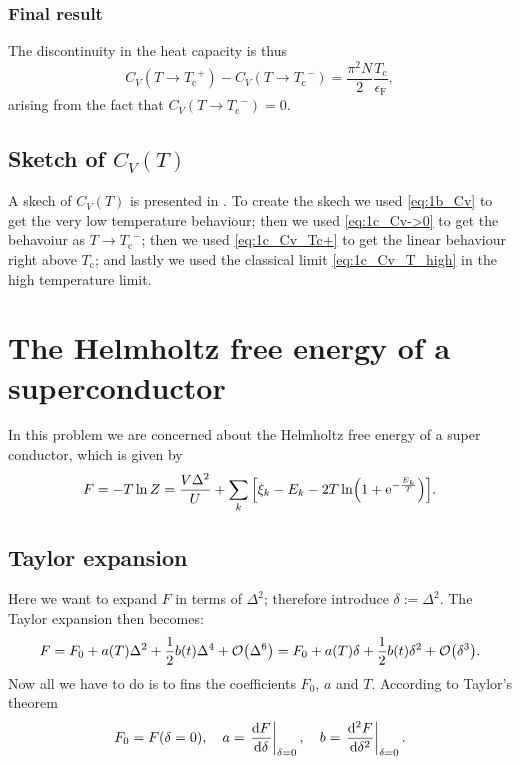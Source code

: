\documentclass[11pt,letter, swedish, english
]{article}
\newcommand{\Tc}{\ensuremath{T_{\text{c}}}}
\newcommand{\eF}{\ensuremath{\epsilon_{\text{F}}}}
\begin{document}
\subsubsection{Final result}
The discontinuity in the heat capacity is thus
\begin{equation}
C_V(T\to\Tc^+)-C_V(T\to\Tc^-)=\frac{\pi^2N}{2}\frac{\Tc}{\eF},
\end{equation}
arising from the fact that $C_V(T\to\Tc^-)=0$.

\subsection{Sketch of $C_V(T)$}
A skech of $C_V(T)$ is presented in . To create the
skech we used \eqref{eq:1b_Cv} to get the very low temperature
behaviour; then we used \eqref{eq:1c_Cv->0} to get the behavoiur as
$T\to\Tc^-$; then we used \eqref{eq:1c_Cv_Tc+} to get the linear
behaviour right above $\Tc$; and lastly we used the classical limit
\eqref{eq:1c_Cv_T_high} in the high temperature limit.

\begin{figure}
\centering
\resizebox{.7\textwidth}{!}{}
\caption{}
\label{fig:1_Cv}
\end{figure}


















\section{The Helmholtz free energy of a superconductor}
\newcommand{\xD}{x_{\text{D}}}
In this problem we are concerned about the Helmholtz free energy of a
super conductor, which is given by
\begin{equation}\label{eq:2_F}
F=-T\ln{Z}=\frac{V\Delta^2}{U} + 
\sum_k\qty[\xi_k-E_k-2T\ln(1+\mathrm{e}^{-\frac{E_k}{T}})].
\end{equation}

\subsection{Taylor expansion}
Here we want to expand $F$ in terms of $\Delta^2$; therefore introduce
$\delta:=\Delta^2$. The Taylor expansion then becomes:
\begin{equation}\label{eq:2a_Taylor_F}
F=F_0+a(T)\Delta^2 + \frac{1}{2}b(t)\Delta^4+\order{\Delta^6}
=F_0+a(T)\delta + \frac{1}{2}b(t)\delta^2+\order{\delta^3}.
\end{equation}
Now all we have to do is to fins the coefficients $F_0$, $a$ and $T$. 
According to Taylor's theorem 
\begin{equation}\label{eq2a:coeff}
F_0=F(\delta=0)\qcomma
a=\eval{\dv{F}{\delta}}_{\delta=0}\qcomma
b=\eval{\dv[2]{F}{\delta}}_{\delta=0}.
\end{equation}
\end{document}
